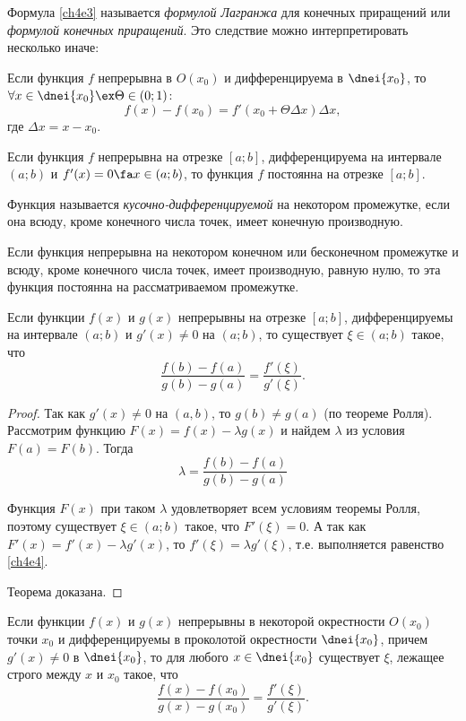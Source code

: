 Формула \eqref{ch4e3} называется \textit{формулой Лагранжа} для конечных приращений или \textit{формулой конечных приращений}.
Это следствие можно интерпретировать несколько иначе:

\begin{cons}
Если функция $f$ непрерывна в $O(x_0)$ и дифференцируема в $\dnei{x_0}$, то $\forall x \in \dnei{x_0} \ex \Theta \in (0;1)$:
$$
f(x) - f(x_0) = f'(x_0 + \Theta\Delta x)\Delta x,
$$
где $\Delta x=x-x_0$.
\end{cons}

\begin{cons}
Если функция $f$ непрерывна на отрезке $[a; b]$, дифференцируема на интервале $(a;b)$ и $f'(x) = 0 \fa x \in (a;b)$, то функция $f$ постоянна на отрезке $[a; b]$.	
\end{cons}

\begin{defn}Функция называется \textit{кусочно-дифференцируемой} на некотором промежутке, если она всюду, кроме конечного числа точек, имеет конечную производную.
\end{defn}

\begin{cons} Если функция непрерывна на некотором конечном или бесконечном промежутке и всюду, кроме конечного числа точек, имеет производную, равную нулю, то эта функция постоянна на рассматриваемом промежутке.
\end{cons}

\begin{thm} [Коши] Если функции $f(x)$ и $g(x)$ непрерывны на отрезке $[a; b]$, дифференцируемы на интервале $(a; b)$ и $g'(x) \ne 0$ на $(a; b)$, то существует $\xi \in (a; b)$ такое, что
\begin{equation}
\label{ch4e4}
\frac{f(b)-f(a)}{g(b)-g(a)}=\frac{f'(\xi)}{g'(\xi)}.
\end{equation}
\end{thm}

\begin{proof} Так как $g'(x) \ne 0$ на $(a,b)$, то $g(b)\ne g(a)$ (по теореме Ролля). Рассмотрим функцию $F(x) =f(x) - \lambda g(x)$ и найдем $\lambda$ из условия $F(a) = F(b)$. Тогда
$$
\lambda = \frac{f(b)-f(a)}{g(b)-g(a)}
$$

Функция $F(x)$ при таком $\lambda$ удовлетворяет всем условиям теоремы Ролля, поэтому существует $\xi \in (a; b)$ такое, что $F'(\xi) = 0$. А так как $F'(x) = f'(x) - \lambda g'(x)$, то $f'(\xi) = \lambda g'(\xi)$, т.е. выполняется равенство \eqref{ch4e4}.

\noindent Теорема доказана.
\end{proof}

\begin{cons} \label{ch4.1cons5}
	Если функции $f(x)$ и $g(x)$ непрерывны в некоторой окрестности $O(x_0)$ точки $x_0$ и дифференцируемы в проколотой
окрестности $\dnei{x_0}$, причем $g'(x) \ne 0$ в  $\dnei{x_0}$, то  для любого $x \in  \dnei{x_0}$ существует $\xi$, лежащее строго между $x$ и $x_0$ такое, что
$$
\frac{f(x)-f(x_0)}{g(x)-g(x_0)}=\frac{f'(\xi)}{g'(\xi)}.
$$
\end{cons}